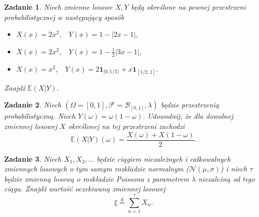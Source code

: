 \documentclass{mwart}
\newtheorem{zd}{Zadanie}
\begin{document}
\begin{zd}
	Niech zmienne losowe $X,Y$ będą określone na pewnej przestrzeni probabilistycznej w następujący sposób
	\begin{itemize}
	\item $X(x) = 2x^2,\ \ \ \ Y(x) = 1 - |2x - 1|$,
	\item $X(x) = 2x^2, \ \ \ \ Y(x) = 1 - \frac{1}{2}\left|3x-1\right|$,
	\item $X(x) = x^2, \ \ \ \ Y(x) = 2\pmb{1}_{[0, 1/2)} + x\pmb{1}_{[1/2, 1]}$.
	\end{itemize}
	Znajdź $\mathbb{E}(X|Y)$.
\end{zd}

\begin{zd}
	Niech $(\Omega = [0,1], \mathcal{F} = \mathcal{B}_{[0,1]}, \lambda)$ będzie przestrzenią probabilistyczną. Niech $Y(\omega) = \omega(1-\omega)$. Udowodnij, że dla dowolnej zmiennej losowej $X$ określonej na tej przestrzeni zachodzi
	\begin{displaymath}
	 \mathbb{E}(X|Y)(\omega) = \frac{X(\omega) + X(1-\omega)}{2}.
	\end{displaymath}
\end{zd}

\begin{zd}
	Niech $X_1, X_2, \dots $ będzie ciągiem niezależnych i całkowalnych zmiennych losowych o tym samym rozkładzie normalnym ($\mathcal{N}(\mu,\sigma)$) i niech $\tau$ będzie zmienną losową o rozkładzie Poissona z parametrem $\lambda$ niezależną od tego ciągu. Znajdź wartość oczekiwaną zmiennej losowej
	\begin{displaymath}
	\xi \stackrel{d}{=} \sum_{n=1}^\tau X_n.
	\end{displaymath}
\end{zd}
\end{document}
